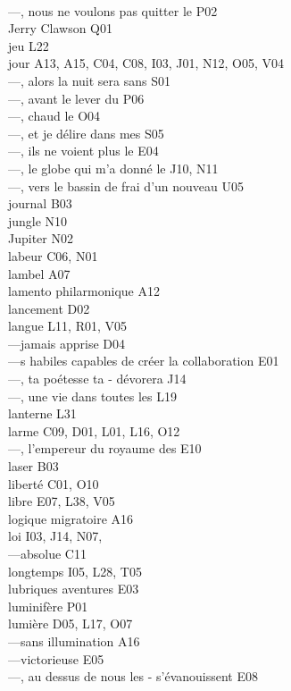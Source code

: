 \documentclass[1pt, onecolumn, oneside, a4paper] {book}
\newenvironment{verse01}{
\fontfamily{jkplos}\selectfont
\vspace{10mm}


}
\newlength{\phila}
\begin{document}
\begin{verse01}
\\---, nous ne voulons pas quitter le P02
\\Jerry Clawson Q01
\\jeu L22
\\jour A13, A15, C04, C08, I03, J01, N12, O05, V04
\\---, alors la nuit sera sans S01
\\---, avant le lever du P06
\\---, chaud le O04
\\---, et je délire dans mes S05
\\---, ils ne voient plus le E04
\\---, le globe qui m’a donné le J10, N11
\\---, vers le bassin de frai d’un nouveau U05
\\journal B03
\\jungle N10
\\Jupiter N02
\\labeur C06, N01
\\lambel A07
\\lamento philarmonique A12
\\lancement D02
\\langue L11, R01, V05
\\---jamais apprise D04
\\---s habiles capables de créer la collaboration E01
\\---, ta poétesse ta - dévorera J14
\\---, une vie dans toutes les L19
\\lanterne L31
\\larme C09, D01, L01, L16, O12
\\---, l’empereur du royaume des E10
\\laser B03
\\liberté C01, O10
\\libre E07, L38, V05
\\logique migratoire A16
\\loi I03, J14, N07,
\\---absolue C11
\\longtemps I05, L28, T05
\\lubriques aventures E03
\\luminifère P01
\\lumière D05, L17, O07
\\---sans illumination A16
\\---victorieuse E05
\\---, au dessus de nous les - s’évanouissent E08

\end{verse01}
\end{document}
